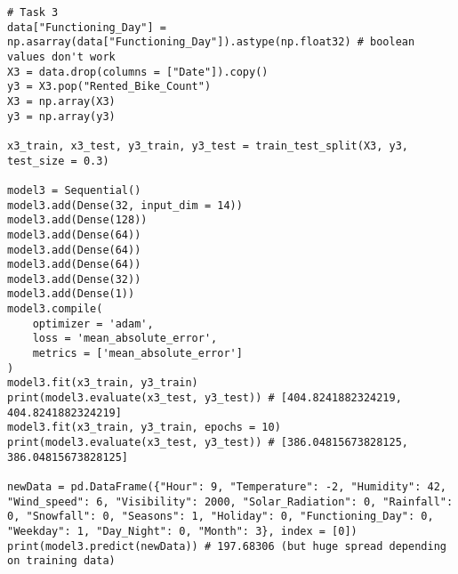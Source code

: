 \documentclass{article}
\begin{document}
\begin{lstlisting}[tabsize=2]
# Task 3
data["Functioning_Day"] = np.asarray(data["Functioning_Day"]).astype(np.float32) # boolean values don't work
X3 = data.drop(columns = ["Date"]).copy()
y3 = X3.pop("Rented_Bike_Count")
X3 = np.array(X3)
y3 = np.array(y3)

x3_train, x3_test, y3_train, y3_test = train_test_split(X3, y3, test_size = 0.3)

model3 = Sequential()
model3.add(Dense(32, input_dim = 14))
model3.add(Dense(128))
model3.add(Dense(64))
model3.add(Dense(64))
model3.add(Dense(64))
model3.add(Dense(32))
model3.add(Dense(1))
model3.compile(
	optimizer = 'adam', 
	loss = 'mean_absolute_error', 
	metrics = ['mean_absolute_error']
)
model3.fit(x3_train, y3_train)
print(model3.evaluate(x3_test, y3_test)) # [404.8241882324219, 404.8241882324219]
model3.fit(x3_train, y3_train, epochs = 10)
print(model3.evaluate(x3_test, y3_test)) # [386.04815673828125, 386.04815673828125]

newData = pd.DataFrame({"Hour": 9, "Temperature": -2, "Humidity": 42, "Wind_speed": 6, "Visibility": 2000, "Solar_Radiation": 0, "Rainfall": 0, "Snowfall": 0, "Seasons": 1, "Holiday": 0, "Functioning_Day": 0, "Weekday": 1, "Day_Night": 0, "Month": 3}, index = [0])
print(model3.predict(newData)) # 197.68306 (but huge spread depending on training data)
	\end{lstlisting}
	
\end{document}
